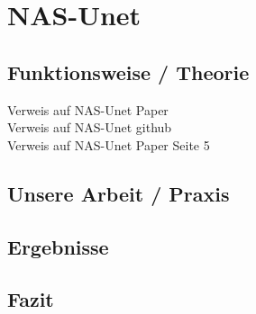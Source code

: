 \chapter{NAS-Unet}
\label{ch:nasunet}




\section{Funktionsweise / Theorie}
Verweis auf NAS-Unet Paper \cite{nasunetPaper} \\
Verweis auf NAS-Unet github \cite{nasunetGithub}\\
Verweis auf NAS-Unet Paper Seite 5 \parencite[Seite 5]{nasunetPaper} \\

\section{Unsere Arbeit / Praxis}


\section{Ergebnisse}


\section{Fazit}